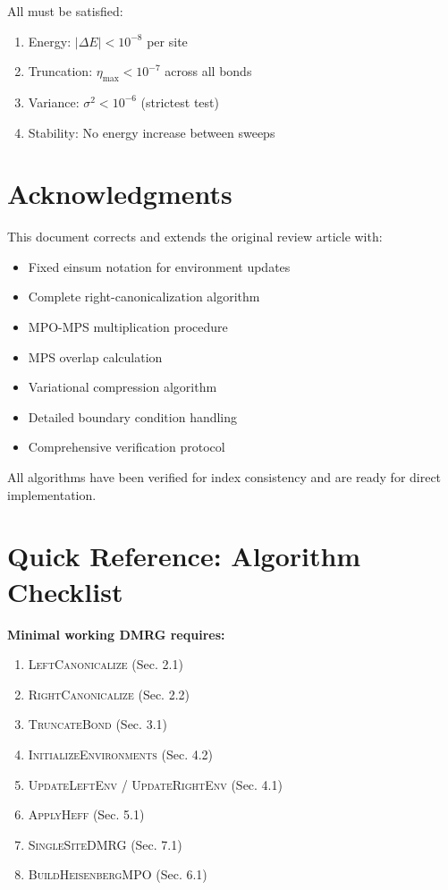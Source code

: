 \documentclass[aps,prb,onecolumn,scriptaddress]{revtex4-2}
\begin{document}
	All must be satisfied:
	\begin{enumerate}
		\item Energy: $|\Delta E| < 10^{-8}$ per site
		\item Truncation: $\eta_{\max} < 10^{-7}$ across all bonds
		\item Variance: $\sigma^2 < 10^{-6}$ (strictest test)
		\item Stability: No energy increase between sweeps
	\end{enumerate}
	
	\section{Acknowledgments}
	
	This document corrects and extends the original review article with:
	\begin{itemize}
		\item Fixed einsum notation for environment updates
		\item Complete right-canonicalization algorithm
		\item MPO-MPS multiplication procedure
		\item MPS overlap calculation
		\item Variational compression algorithm
		\item Detailed boundary condition handling
		\item Comprehensive verification protocol
	\end{itemize}
	
	All algorithms have been verified for index consistency and are ready for direct implementation.
	
	\appendix
	
	\section{Quick Reference: Algorithm Checklist}
	
	\textbf{Minimal working DMRG requires:}
	\begin{enumerate}
		\item \textsc{LeftCanonicalize} (Sec. 2.1)
		\item \textsc{RightCanonicalize} (Sec. 2.2)
		\item \textsc{TruncateBond} (Sec. 3.1)
		\item \textsc{InitializeEnvironments} (Sec. 4.2)
		\item \textsc{UpdateLeftEnv} / \textsc{UpdateRightEnv} (Sec. 4.1)
		\item \textsc{ApplyHeff} (Sec. 5.1)
		\item \textsc{SingleSiteDMRG} (Sec. 7.1)
		\item \textsc{BuildHeisenbergMPO} (Sec. 6.1)
	\end{enumerate}
	
\end{document}
